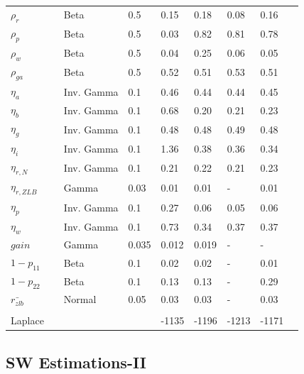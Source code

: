\documentclass[12pt,reqno]{article}
\numberwithin{equation}{section}
\begin{document}
\begin{table}[H]
\begin{tabular}{llll|ll|lll}
$\rho_r$ &  & Beta & 0.5 			& 0.15 & 0.18 & 0.08 & 0.16 \\
$\rho_p$ &  & Beta & 0.5 			& 0.03 & 0.82 & 0.81 & 0.78 \\
$\rho_w$ &  & Beta & 0.5 			& 0.04 & 0.25 & 0.06 & 0.05 \\
$\rho_{ga}$ &  & Beta & 0.5 		& 0.52 & 0.51 & 0.53 & 0.51 \\
$\eta_a$ &  & Inv. Gamma & 0.1 		& 0.46 & 0.44 & 0.44 & 0.45 \\
$\eta_b$ &  & Inv. Gamma & 0.1 		& 0.68 & 0.20 & 0.21 & 0.23 \\
$\eta_g$ &  & Inv. Gamma & 0.1 		& 0.48 & 0.48 & 0.49 & 0.48 \\
$\eta_i$ &  & Inv. Gamma & 0.1 		& 1.36 & 0.38 & 0.36 & 0.34 \\
$\eta_{r,N}$ &  & Inv. Gamma & 0.1 	& 0.21 & 0.22 & 0.21 & 0.23 \\
$\eta_{r,ZLB}$ &  & Gamma & 0.03 	& 0.01 & 0.01 & - & 0.01 \\
$\eta_p$ &  & Inv. Gamma & 0.1 		& 0.27 & 0.06 & 0.05 & 0.06 \\
$\eta_w$ &  & Inv. Gamma & 0.1 		& 0.73 & 0.34 & 0.37 & 0.37 \\
$gain$ &  & Gamma & 0.035 			& 0.012 & 0.019 & - &  -\\
$1-p_{11}$ &  & Beta & 0.1 			& 0.02 & 0.02 & - & 0.01 \\
$1-p_{22}$ &  & Beta & 0.1 			& 0.13 & 0.13 & - & 0.29 \\
$\bar{r_{zlb}}$ &  & Normal & 0.05 	& 0.03 & 0.03 & - & 0.03 \\
 &  &  &  &  &  &  &  \\
Laplace &  &  &  & -1135 & -1196 & -1213 & -1171
\end{tabular}
\end{table}


\subsection*{SW Estimations-II}
\end{document}
